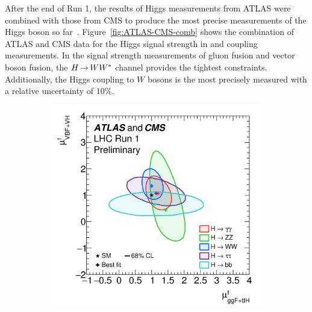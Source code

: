 After the end of Run 1, the results of Higgs measurements from ATLAS were combined with those from CMS to produce the most precise measurements of the Higgs boson so far~\cite{ATLASCMSHiggs}. Figure~\ref{fig:ATLAS-CMS-comb} shows the combination of ATLAS and CMS data for the Higgs signal strength in and coupling measurements. In the signal strength measurements of gluon fusion and vector boson fusion, the $H{\,{\rightarrow}\,}WW^\ast$ channel provides the tightest constraints. Additionally, the Higgs coupling to $W$ bosons is the most precisely measured with a relative uncertainty of $10\%$. 

\begin{figure}[h!]
  \centering
  \captionsetup{justification=centering}

   \begin{subfigure}[t]{0.5\textwidth}
        \centering
        \includegraphics[width=\textwidth]{figures/ATLAS_CMS_mu}
        \caption{}
    \end{subfigure}%
    \begin{subfigure}[t]{0.5\textwidth}
        \centering

\end{subfigure}
\end{figure}

